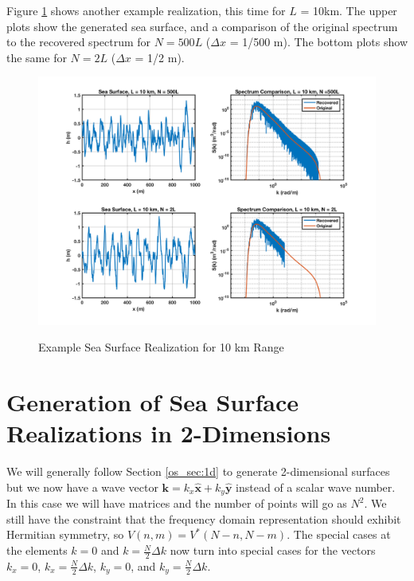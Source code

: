 Figure \ref{os_fig:7aa} shows another example realization, this time for $L$ = 10km. The upper plots show the generated sea surface, and a comparison of the original spectrum to the recovered spectrum for $N = 500L$ ($\Delta x$ = 1/500 m). The bottom plots show the same for $N=2L$ ($\Delta x$ = 1/2 m).
\begin{figure}[H]
  \begin{center}
\includegraphics[width=6in]{../media/Ocean_Surface/sea_surface_10000.png}
  \end{center}
  \renewcommand{\baselinestretch}{1} \small\normalsize
  \begin{quote}
    \caption[Example Sea Surface Realization for 10 km Range]{Example Sea Surface Realization for 10 km Range\label{os_fig:7aa}}
  \end{quote}
\end{figure}
\renewcommand{\baselinestretch}{2} \small\normalsize

\section{Generation of Sea Surface Realizations in 2-Dimensions}
We will generally follow Section \ref{os_sec:1d} to generate 2-dimensional surfaces but we now have a wave vector $\mathbf{k} = k_x\hat{\mathbf{x}} + k_y\hat{\mathbf{y}}$ instead of a scalar wave number. In this case we will have matrices and the number of points will go as $N^2$. We still have the constraint that the frequency domain representation should exhibit Hermitian symmetry, so $V(n,m) = V^*(N-n,N-m)$. The special cases at the elements $k = 0$ and $k = \frac{N}{2}\Delta k$ now turn into special cases for the vectors $k_x = 0$, $k_x = \frac{N}{2}\Delta k$, $k_y = 0$, and $k_y = \frac{N}{2}\Delta k$. 

